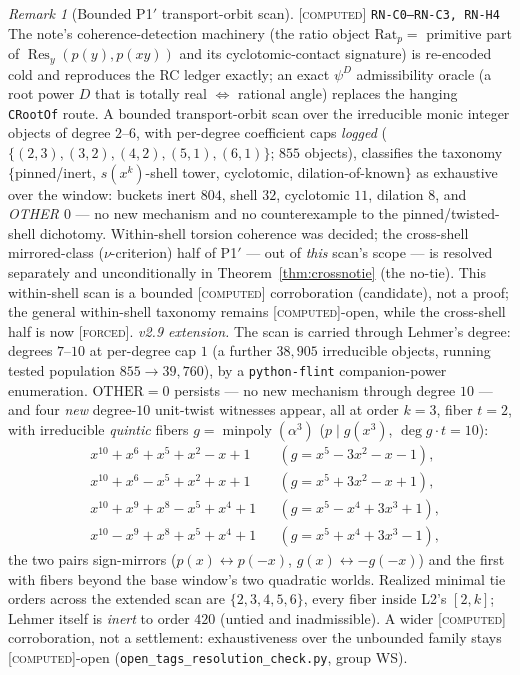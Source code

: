 \documentclass[11pt]{article}
\newcommand{\tagF}{\textcolor{cF}{\textsc{[forced]}}}
\newcommand{\tagC}{\textcolor{cC}{\textsc{[computed]}}}
\newcommand{\hx}[1]{\textcolor{cC}{\footnotesize\texttt{#1}}}
\theoremstyle{plain}
\theoremstyle{definition}
\theoremstyle{remark}
\newtheorem{remark}[theorem]{Remark}
\begin{document}
\begin{remark}[Bounded P1$'$ transport-orbit scan]\label{rem:p1scan}\tagC{} \hx{RN-C0--RN-C3, RN-H4}
The note's coherence-detection machinery (the ratio object
$\mathrm{Rat}_p=$ primitive part of $\operatorname{Res}_y(p(y),p(xy))$ and its
cyclotomic-contact signature) is re-encoded cold and reproduces the RC ledger
exactly; an exact $\psi^D$ admissibility oracle (a root power $D$ that is
totally real $\iff$ rational angle) replaces the hanging \texttt{CRootOf}
route. A bounded transport-orbit scan over the irreducible monic integer
objects of degree $2$--$6$, with per-degree coefficient caps \emph{logged}
($\{(2,3),(3,2),(4,2),(5,1),(6,1)\}$; $855$ objects), classifies the taxonomy
$\{$pinned/inert, $s(x^k)$-shell tower, cyclotomic, dilation-of-known$\}$ as
exhaustive over the window: buckets inert $804$, shell $32$, cyclotomic $11$,
dilation $8$, and \emph{OTHER $0$} --- no new mechanism and no counterexample
to the pinned/twisted-shell dichotomy. Within-shell torsion coherence was
decided; the cross-shell mirrored-class ($\nu$-criterion) half of P1$'$ --- out
of \emph{this} scan's scope --- is resolved separately and unconditionally in
Theorem~\ref{thm:crossnotie} (the no-tie). This within-shell scan is a bounded
\tagC{} corroboration (candidate), not a proof; the general within-shell
taxonomy remains \tagC{}-open, while the cross-shell half is now \tagF{}.
\emph{v2.9 extension.} The scan is carried through Lehmer's degree: degrees
$7$--$10$ at per-degree cap $1$ (a further $38{,}905$ irreducible objects, running
tested population $855\to39{,}760$), by a \texttt{python-flint} companion-power
enumeration. $\mathrm{OTHER}=0$ persists --- no new mechanism through degree $10$
--- and four \emph{new} degree-$10$ unit-twist witnesses appear, all at order $k=3$,
fiber $t=2$, with irreducible \emph{quintic} fibers $g=\operatorname{minpoly}(\alpha^3)$
($p\mid g(x^3)$, $\deg g\cdot t=10$):
\[
\begin{aligned}
&x^{10}+x^{6}+x^{5}+x^{2}-x+1 &&(g=x^5-3x^2-x-1),\\
&x^{10}+x^{6}-x^{5}+x^{2}+x+1 &&(g=x^5+3x^2-x+1),\\
&x^{10}+x^{9}+x^{8}-x^{5}+x^{4}+1 &&(g=x^5-x^4+3x^3+1),\\
&x^{10}-x^{9}+x^{8}+x^{5}+x^{4}+1 &&(g=x^5+x^4+3x^3-1),
\end{aligned}
\]
the two pairs sign-mirrors ($p(x)\leftrightarrow p(-x)$, $g(x)\leftrightarrow-g(-x)$)
and the first with fibers beyond the base window's two quadratic worlds. Realized
minimal tie orders across the extended scan are $\{2,3,4,5,6\}$, every fiber inside
L2's $[2,k]$; Lehmer itself is \emph{inert} to order $420$ (untied and inadmissible).
A wider \tagC{} corroboration, not a settlement: exhaustiveness over the unbounded
family stays \tagC{}-open (\texttt{open\_tags\_resolution\_check.py}, group WS).
\end{remark}
\end{document}
